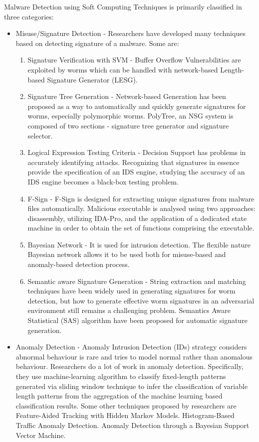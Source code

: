 \documentclass[11pt]{article}
\begin{document}
	Malware Detection using Soft Computing Techniques is primarily classified in three categories:
	\begin{itemize}
		\item Misuse/Signature Detection - Researchers have developed many techniques based on detecting signature of a malware. Some are:
		\begin{enumerate}
			\item Signature Verification with SVM - Buffer Overflow Vulnerabilities are exploited by worms which can be handled with network-based Length-based Signature Generator (LESG).
			\item Signature Tree Generation - Network-based Generation has been proposed as a way to automatically and quickly generate signatures for worms, especially polymorphic worms. PolyTree, an NSG system is composed of two sections - signature tree generator and signature selector.
			\item Logical Expression Testing Criteria - Decision Support has problems in accurately identifying attacks. Recognizing that signatures in essence provide the specification of an IDS engine, studying the accuracy of an IDS engine becomes a black-box testing problem.
			\item F-Sign - F-Sign is designed for extracting unique signatures from malware files automatically. Malicious executable is analysed using two approaches: disassembly, utilizing IDA-Pro, and the application of a dedicated state machine in order to obtain the set of functions comprising the executable.
			\item Bayesian Network - It is used for intrusion detection. The flexible nature Bayesian network allows it to be used both for misuse-based and anomaly-based detection process.
			\item Semantic aware Signature Generation - String extraction and matching techniques have been widely used in generating signatures for worm detection, but how to generate effective worm signatures in an adversarial environment still remains a challenging problem. Semantics Aware Statistical (SAS) algorithm have been proposed for automatic signature generation.
		\end{enumerate}
		\item Anomaly Detection - Anomaly Intrusion Detection (IDs) strategy considers abnormal behaviour is rare and tries to model normal rather than anomalous behaviour. Researchers do a lot of work in anomaly detection. Specifically, they use machine-learning algorithm to classify fixed-length patterns generated via sliding window technique to infer the classification of variable length patterns from the aggregation of the machine learning based classification results. Some other techniques proposed by researchers are Feature-Aided Tracking with Hidden Markov Models. Histogram-Based Traffic Anomaly Detection. Anomaly Detection through a Bayesian Support Vector Machine.

\end{itemize}
\end{document}
